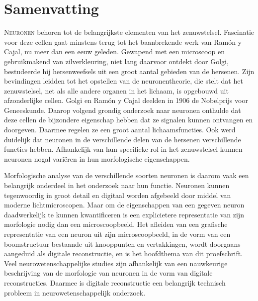 %
%
\noquote
{}

\chpos{22mm}{12mm}
\chapter*{Samenvatting}

\lettrine{N}{euronen} behoren tot de belangrijkste elementen van het zenuwstelsel. Fascinatie voor deze cellen gaat minstens terug tot het baanbrekende werk van Ram\'{o}n y Cajal, nu meer dan een eeuw geleden. Gewapend met een microscoop en gebruikmakend van zilverkleuring, niet lang daarvoor ontdekt door Golgi, bestudeerde hij hersenweefsels uit een groot aantal gebieden van de hersenen. Zijn bevindingen leidden tot het opstellen van de neuronentheorie, die stelt dat het zenuwstelsel, net als alle andere organen in het lichaam, is opgebouwd uit afzonderlijke cellen. Golgi en Ram\'{o}n y Cajal deelden in 1906 de Nobelprijs voor Geneeskunde. Daarop volgend grondig onderzoek naar neuronen onthulde dat deze cellen de bijzondere eigenschap hebben dat ze signalen kunnen ontvangen en doorgeven. Daarmee regelen ze een groot aantal lichaamsfuncties. Ook werd duidelijk dat neuronen in de verschillende delen van de hersenen verschillende functies hebben. Afhankelijk van hun specifieke rol in het zenuwstelsel kunnen neuronen nogal variëren in hun morfologische eigenschappen.

Morfologische analyse van de verschillende soorten neuronen is daarom vaak een belangrijk onderdeel in het onderzoek naar hun functie. Neuronen kunnen tegenwoordig in groot detail en digitaal worden afgebeeld door middel van moderne lichtmicroscopen. Maar om de eigenschappen van een gegeven neuron daadwerkelijk te kunnen kwantificeren is een explicietere representatie van zijn morfologie nodig dan een microscoopbeeld. Het afleiden van een grafische representatie van een neuron uit zijn microscoopbeeld, in de vorm van een boomstructuur bestaande uit knooppunten en vertakkingen, wordt doorgaans aangeduid als digitale reconstructie, en is het hoofdthema van dit proefschrift. Veel neurowetenschappelijke studies zijn afhankelijk van een nauwkeurige beschrijving van de morfologie van neuronen in de vorm van digitale reconstructies. Daarmee is digitale reconstructie een belangrijk technisch probleem in neurowetenschappelijk onderzoek.

